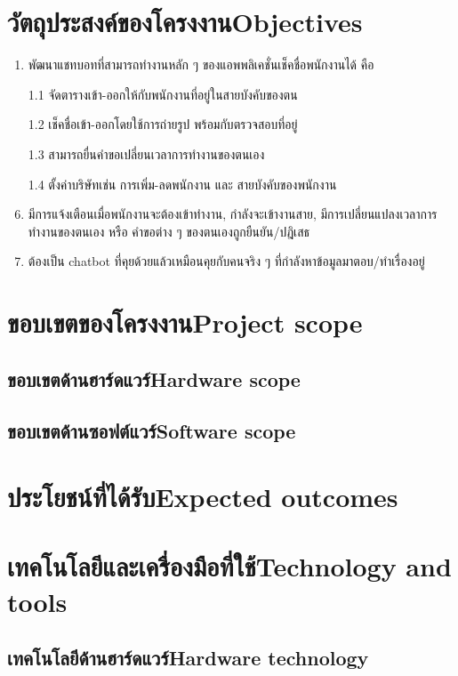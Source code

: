 \section{\ifcpe วัตถุประสงค์ของโครงงาน\else Objectives\fi}
\begin{enumerate}
    \item พัฒนาแชทบอทที่สามารถทำงานหลัก ๆ ของแอพพลิเคชั่นเช็คชื่อพนักงานได้ คือ 
    \item[1.1] จัดตารางเข้า-ออกให้กับพนักงานที่อยู่ในสายบังคับของตน
    \item[1.2] เช็คชื่อเข้า-ออกโดยใช้การถ่ายรูป พร้อมกับตรวจสอบที่อยู่ 
    \item[1.3] สามารถยื่นคำขอเปลี่ยนเวลาการทำงานของตนเอง
    \item[1.4] ตั้งค่าบริษัทเช่น การเพิ่ม-ลดพนักงาน และ สายบังคับของพนักงาน 
    \item มีการแจ้งเตือนเมื่อพนักงานจะต้องเข้าทำงาน, กำลังจะเข้างานสาย, มีการเปลี่ยนแปลงเวลาการทำงานของตนเอง หรือ คำขอต่าง ๆ ของตนเองถูกยืนยัน/ปฎิเสธ
    \item ต้องเป็น chatbot ที่คุยด้วยแล้วเหมือนคุยกับคนจริง ๆ ที่กำลังหาข้อมูลมาตอบ/ทำเรื่องอยู่
\end{enumerate}

\section{\ifcpe ขอบเขตของโครงงาน\else Project scope\fi}

\subsection{\ifcpe ขอบเขตด้านฮาร์ดแวร์\else Hardware scope\fi}

\subsection{\ifcpe ขอบเขตด้านซอฟต์แวร์\else Software scope\fi}

\section{\ifcpe ประโยชน์ที่ได้รับ\else Expected outcomes\fi}

\section{\ifcpe เทคโนโลยีและเครื่องมือที่ใช้\else Technology and tools\fi}

\subsection{\ifcpe เทคโนโลยีด้านฮาร์ดแวร์\else Hardware technology\fi}

